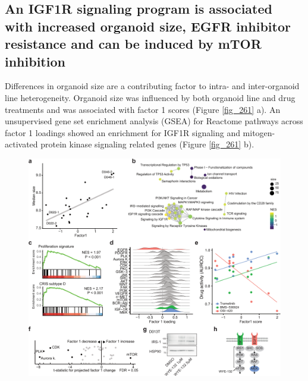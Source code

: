 \begin{flushleft}
\newpage
\section{An IGF1R signaling program is associated with increased organoid size, EGFR inhibitor resistance and can be induced by mTOR inhibition}

Differences in organoid size are a contributing factor to intra- and inter-organoid line heterogeneity. Organoid size was influenced by both organoid line and drug treatments and was associated with factor 1 scores (Figure \ref{fig_261} a). An unsupervised gene set enrichment analysis (GSEA) for Reactome pathways across factor 1 loadings showed an enrichment for IGF1R signaling and mitogen-activated protein kinase signaling related genes (Figure \ref{fig_261} b). 

\begin{figure}[h!]
\centering
\includegraphics[width=\textwidth,
                height=\textheight,
                keepaspectratio]{figures/promise/pdf/fig_6_1.pdf}

\end{figure}
\end{flushleft}
